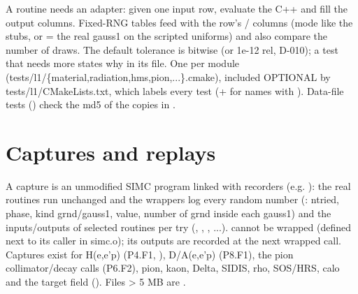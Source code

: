 A routine needs an adapter: given one input row, evaluate the C++ and fill the output columns. Fixed-RNG tables feed
 with the row's / columns (mode  like the stubs, or  = the real gauss1 on the
scripted uniforms) and also compare the number of draws. The default tolerance is bitwise (or 1e-12 rel, D-010); a test
that needs more states why in its  file. One  per module (tests/\allowbreak{}l1/\allowbreak{}\{material,\allowbreak{}radiation,\allowbreak{}hms,\allowbreak{}pion,\allowbreak{}...\}.cmake),\allowbreak{}
included OPTIONAL by tests/\allowbreak{}l1/\allowbreak{}CMakeLists.\allowbreak{}txt,\allowbreak{} which labels every test  (+  for names with ).
Data-file tests () check the md5 of the copies in .

\section{\texorpdfstring{Captures and replays}{Captures and replays}}\label{translation_report-02u5fvalidation:23-captures-and-replays}
A capture is an unmodified SIMC program linked with  recorders (e.g. ):
the real routines run unchanged and the wrappers log every random number (: ntried, phase, kind grnd/\allowbreak{}gauss1,\allowbreak{}
value, number of grnd inside each gauss1) and the inputs/\allowbreak{}outputs of selected routines per try (,
, , ...).  cannot be wrapped (defined next to its caller in simc.o);
its outputs are recorded at the next wrapped call. Captures exist for H(e,e'p) (P4.F1, ), D/A(e,e'p) (P8.F1), the pion collimator/\allowbreak{}decay calls (P6.F2), pion, kaon, Delta, SIDIS, rho, SOS/HRS, calo
and the target field (). Files > 5 MB are .

